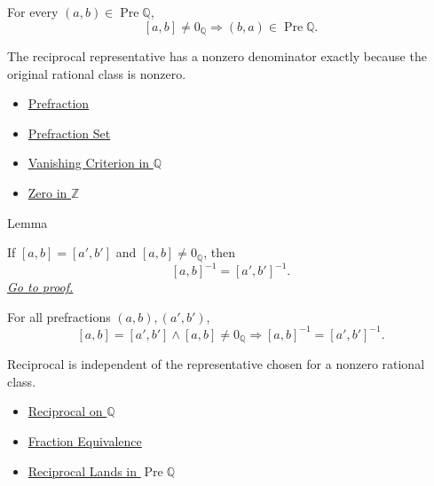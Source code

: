 \begin{remark*}
For every $(a,b)\in\operatorname{Pre}\mathbb{Q}$,
\[
[a,b]\ne 0_{\mathbb{Q}}\Longrightarrow (b,a)\in\operatorname{Pre}\mathbb{Q}.
\]
\end{remark*}

\begin{remark*}[Interpretation]
The reciprocal representative has a nonzero denominator exactly because the
original rational class is nonzero.
\end{remark*}

\begin{dependencies}
\begin{itemize}
  \item \hyperref[def:prefraction]{Prefraction}
  \item \hyperref[def:prefraction-set]{Prefraction Set}
  \item \hyperref[lem:vanishing-criterion-q]{Vanishing Criterion in $\mathbb{Q}$}
  \item \hyperref[def:zero-in-z]{Zero in $\mathbb{Z}$}
\end{itemize}
\end{dependencies}

\begin{lemmabox}{Lemma}
\begin{lemma}
\label{lem:reciprocal-on-q-respects-equivalence}
If $[a,b]=[a',b']$ and $[a,b]\ne 0_{\mathbb{Q}}$, then
\[
[a,b]^{-1}=[a',b']^{-1}.
\]
\hyperref[prf:reciprocal-on-q-respects-equivalence]{\textit{Go to proof.}}
\end{lemma}
\end{lemmabox}

\begin{remark*}
For all prefractions $(a,b),(a',b')$,
\[
[a,b]=[a',b']\land [a,b]\ne 0_{\mathbb{Q}}
\Longrightarrow
[a,b]^{-1}=[a',b']^{-1}.
\]
\end{remark*}

\begin{remark*}[Interpretation]
Reciprocal is independent of the representative chosen for a nonzero rational
class.
\end{remark*}

\begin{dependencies}
\begin{itemize}
  \item \hyperref[def:reciprocal-on-q-classes]{Reciprocal on $\mathbb{Q}$}
  \item \hyperref[def:fraction-equivalence]{Fraction Equivalence}
  \item \hyperref[lem:reciprocal-denominator-nonzero-q]{Reciprocal Lands in $\operatorname{Pre}\mathbb{Q}$}
\end{itemize}
\end{dependencies}

